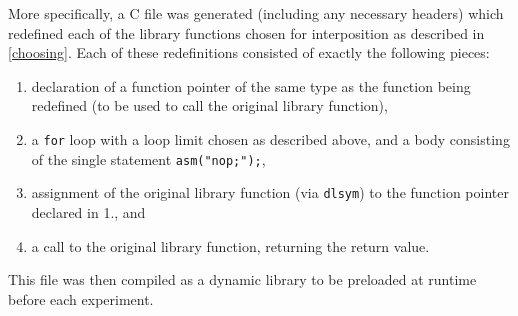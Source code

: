 More specifically, a C file was generated (including any necessary headers) which redefined each of the library functions chosen for interposition as described in \autoref{choosing}.
Each of these redefinitions consisted of exactly the following pieces:
\begin{enumerate}
	\item declaration of a function pointer of the same type as the function being redefined (to be used to call the original library function),
	\item a \texttt{for} loop with a loop limit chosen as described above, and a body consisting of the single statement \texttt{asm("nop;");},
	\item assignment of the original library function (via \texttt{dlsym}) to the function pointer declared in 1., and
	\item a call to the original library function, returning the return value.
\end{enumerate}
This file was then compiled as a dynamic library
to be preloaded at runtime before each experiment.
